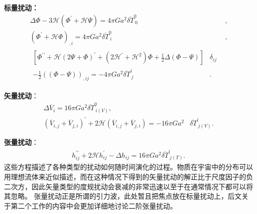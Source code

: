 \textbf{标量扰动：}
\begin{align}
  \Delta\Phi-3\mathcal{H}{\left(\Phi^\prime+\mathcal{H}\Psi\right)} =
  4\pi Ga^2\overline{\delta T}^{0}_{\ 0}&, 
  \label{eq:equation-gauge-scalar-perturbation1}\\
  {\left(\Phi^\prime+\mathcal{H}\Phi\right)}_{,i}=4\pi
  Ga^2\overline{\delta T}^{0}_{\ i}&,
  \label{eq:equation-gauge-scalar-perturbation2}\\
  \begin{split}
    {\left[\Phi^{\prime\prime}+\mathcal{H}{\left(2\Psi+\Phi\right)}^{\prime}+(2\mathcal{H^\prime}+\mathcal{H}^2)\Phi 
+\frac{1}{2}\Delta(\Phi-\Psi)\right]}&\delta_{ij} \\
    -\frac{1}{2}{\left((\Phi-\Psi)\right)}_{,ij} = -4\pi
Ga^2\overline{\delta T}^{i}_{\ j}&.
  \end{split}
  \label{eq:equation-gauge-scalar-perturbation3}
\end{align}

\textbf{矢量扰动}：
\begin{align}
  \label{eq:equation-gauge-vector-perturbation}
  \Delta\overline{V}_{i}=16\pi Ga^2\overline{\delta T}^{0}_{\ i(V)}, \\  
  {\left(\overline{V}_{i,j}+\overline{V}_{j,i}\right)}^{\prime} + 
  2\mathcal{H}{\left(\overline{V}_{i,j}+\overline{V}_{j,i}\right)} = 
  -16\pi Ga^2&\overline{\delta T}^{i}_{\ j(V)}.
\end{align}

\textbf{张量扰动}：
\begin{align}
  \label{eq:equation-gauge-tensor-perturbation}
  h^{\prime\prime}_{ij}+2\mathcal{H}h^\prime_{ij}-\Delta h_{ij}=16\pi
  Ga^2\overline{\delta T}^{i}_{\ j(T)}.
\end{align}
这些方程描述了各种类型的扰动如何随时间演化的过程。物质在宇宙中的分布可以用理想流体来近似描述，而在这种情况下得到的矢量扰动的解正比于尺度因子的负二次方，因此矢量类型的度规扰动会衰减的非常迅速以至于在通常情况下都可以将其忽略。
张量扰动正是所谓的引力波，此处暂且把焦点放在标量扰动上，后文关于第二个工作的内容中会更加详细地讨论二阶张量扰动。

